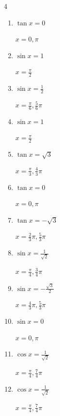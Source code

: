 \begin{multicols}{4}
\begin{enumerate}
  \item $\displaystyle \tan{x}  = 0$

        $\displaystyle x = 0 , \pi$

  \item $\displaystyle \sin{x}  = 1$

        $\displaystyle x = \frac{\pi}{2}$

  \item $\displaystyle \sin{x}  = \frac{1}{2}$

        $\displaystyle x = \frac{\pi}{6} , \frac{5}{6}\pi$

  \item $\displaystyle \sin{x}  = 1$

        $\displaystyle x = \frac{\pi}{2}$

  \item $\displaystyle \tan{x}  = \sqrt{3}$

        $\displaystyle x = \frac{\pi}{3} , \frac{4}{3}\pi$

  \item $\displaystyle \tan{x}  = 0$

        $\displaystyle x = 0 , \pi$

  \item $\displaystyle \tan{x}  = -\sqrt{3}$

        $\displaystyle x = \frac{2}{3}\pi , \frac{5}{3}\pi$

  \item $\displaystyle \sin{x}  = \frac{1}{\sqrt{2}}$

        $\displaystyle x = \frac{\pi}{4} , \frac{3}{4}\pi$

\columnbreak %

  \item $\displaystyle \sin{x}  = -\frac{\sqrt{3}}{2}$

        $\displaystyle x = \frac{4}{3}\pi , \frac{5}{3}\pi$

  \item $\displaystyle \sin{x}  = 0$

        $\displaystyle x = 0 , \pi$

  \item $\displaystyle \cos{x}  = \frac{1}{\sqrt{2}}$

        $\displaystyle x = \frac{\pi}{4} , \frac{7}{4}\pi$

  \item $\displaystyle \cos{x}  = \frac{1}{\sqrt{2}}$

        $\displaystyle x = \frac{\pi}{4} , \frac{7}{4}\pi$


\end{enumerate}
\end{multicols}

